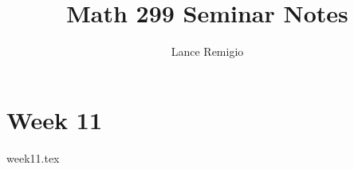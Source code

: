 \documentclass[a4paper]{book}
\author{Lance Remigio}
\title{Math 299 Seminar Notes}
\begin{document}
\maketitle

\chapter{Week 11}

{week11.tex}
\end{document}
